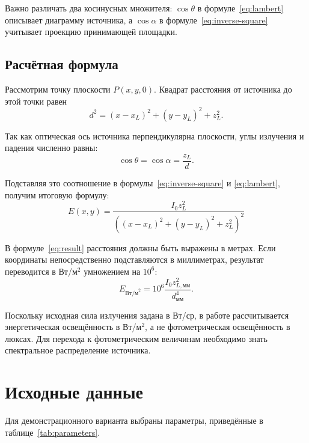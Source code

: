 \documentclass[a4paper,12pt]{article}
\begin{document}
Важно различать два косинусных множителя: $\cos\theta$ в
формуле~\eqref{eq:lambert} описывает диаграмму источника, а $\cos\alpha$ в
формуле~\eqref{eq:inverse-square} учитывает проекцию принимающей площадки.

\subsection{Расчётная формула}

Рассмотрим точку плоскости $P(x,y,0)$. Квадрат расстояния от источника до
этой точки равен
\begin{equation}
  d^2=(x-x_L)^2+(y-y_L)^2+z_L^2.
  \label{eq:distance}
\end{equation}

Так как оптическая ось источника перпендикулярна плоскости, углы излучения и
падения численно равны:
\begin{equation}
  \cos\theta=\cos\alpha=\frac{z_L}{d}.
\end{equation}

Подставляя это соотношение в формулы~\eqref{eq:inverse-square} и
\eqref{eq:lambert}, получим итоговую формулу:
\begin{equation}
  \boxed{
  E(x,y)=
  \frac{I_0z_L^2}
  {\left((x-x_L)^2+(y-y_L)^2+z_L^2\right)^2}}
  \label{eq:result}
\end{equation}

В формуле~\eqref{eq:result} расстояния должны быть выражены в метрах. Если
координаты непосредственно подставляются в миллиметрах, результат переводится
в Вт/м$^2$ умножением на $10^6$:
\begin{equation}
  E_{\text{Вт/м}^2}=10^6
  \frac{I_0z_{L,\text{мм}}^2}{d_{\text{мм}}^4}.
\end{equation}

Поскольку исходная сила излучения задана в Вт/ср, в работе рассчитывается
энергетическая освещённость в Вт/м$^2$, а не фотометрическая освещённость в
люксах. Для перехода к фотометрическим величинам необходимо знать спектральное
распределение источника.

\section{Исходные данные}

Для демонстрационного варианта выбраны параметры, приведённые в
таблице~\ref{tab:parameters}.
\end{document}
